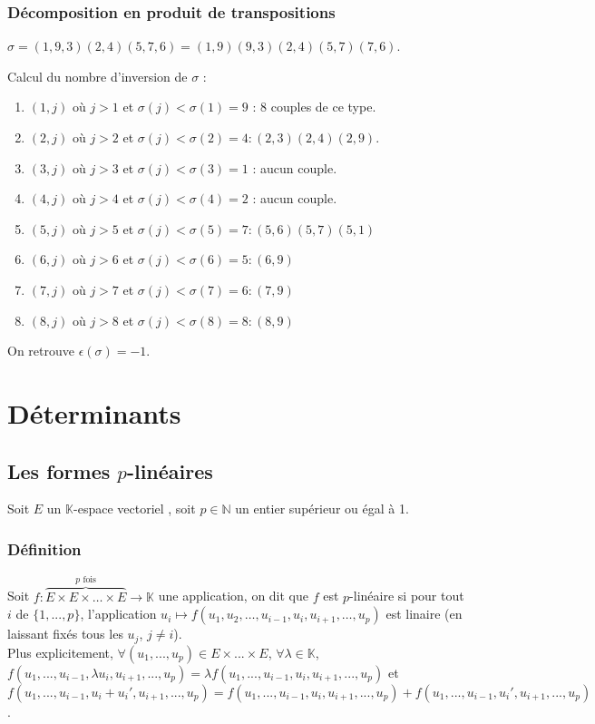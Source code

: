 \documentclass[a4paper,10pt]{book} %
\newcommand{\N}{\mathbb{N}}
\newcommand{\K}{\mathbb{K}}
\newcommand{\ev}{espace vectoriel }
\begin{document}
\subsection{Décomposition en produit de transpositions}
$\sigma=(1,9,3)(2,4)(5,7,6)=(1,9)(9,3)(2,4)(5,7)(7,6)$.

Calcul du nombre d'inversion de $\sigma$ :\\
\begin{enumerate}
\item $(1,j)$ où $j>1$ et $\sigma(j)<\sigma(1)=9$ :  8 couples de ce type.
\item $(2,j)$ où $j>2$ et $\sigma(j)<\sigma(2)=4 : (2,3)(2,4)(2,9)$.
\item $(3,j)$ où $j>3$ et $\sigma(j)<\sigma(3)=1$ : aucun couple.
\item $(4,j)$ où $j>4$ et $\sigma(j)<\sigma(4)=2$ : aucun couple. 
\item $(5,j)$ où $j>5$ et $\sigma(j)<\sigma(5)=7 : (5,6)(5,7)(5,1)$
\item $(6,j)$ où $j>6$ et $\sigma(j)<\sigma(6)=5 : (6,9)$
\item $(7,j)$ où $j>7$ et $\sigma(j)<\sigma(7)=6 : (7,9)$
\item $(8,j)$ où $j>8$ et $\sigma(j)<\sigma(8)=8 : (8,9)$
\end{enumerate}

On retrouve $\epsilon(\sigma)=-1$.




\chapter{Déterminants}
\section{Les formes $p$-linéaires}
Soit $E$ un $\K$-\ev, soit $p\in \N$ un entier supérieur ou égal à 1.

\subsection{Définition}
Soit $f : \overset{p\text{ fois}}{\overbrace{E\times E\times \dots \times E}}\rightarrow \K$ une application, on dit que $f$ est $p$-linéaire si pour tout $i$ de $\{1,...,p\}$, l'application $u_i\mapsto f(u_1,u_2,\dots,u_{i-1},u_i,u_{i+1},\dots,u_p)$ est linaire (en laissant fixés tous les $u_j$, $j\neq i$).\\

Plus explicitement, $\forall (u_1,...,u_p)\in E\times ...\times E$, $\forall \lambda\in \K$,\\ $f(u_1,...,u_{i-1},\lambda u_i,u_{i+1},...,u_p)=\lambda f(u_1,...,u_{i-1},u_i,u_{i+1},...,u_p)$ et\\ $f(u_1,...,u_{i-1},u_i+u_i',u_{i+1},...,u_p)=f(u_1,...,u_{i-1},u_i,u_{i+1},...,u_p)+f(u_1,...,u_{i-1},u_i',u_{i+1},...,u_p)$.
\end{document}
